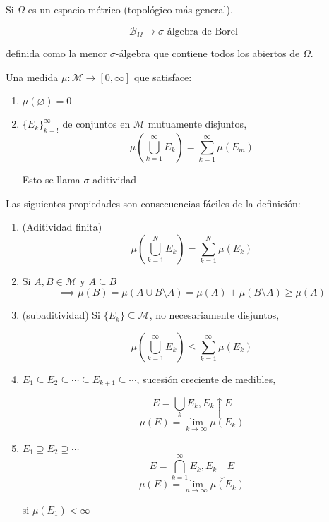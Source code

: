 \begin{fexample}
    Si $\Omega$ es un espacio métrico (topológico más general).

    \[\mathcal{B}_\Omega\to \sigma\text{-álgebra de Borel}\]

    definida como la menor $\sigma$-álgebra que contiene todos los abiertos de $\Omega$.
\end{fexample}

\begin{fdefinition}
    Una medida $\mu:\mathcal{M}\to[0,\infty]$ que satisface:

    \begin{enumerate}
        \item $\mu(\varnothing)=0$
        \item $\{E_k\}_{k=!}^\infty$ de conjuntos en $\mathcal{M}$ mutuamente disjuntos, 
        \[\mu\left(\bigcup_{k=1}^\infty E_k\right)=\sum_{k=1}^\infty \mu(E_m)\]

        Esto se llama $\sigma$-aditividad
    \end{enumerate}
\end{fdefinition}

Las siguientes propiedades son consecuencias fáciles de la definición:

\begin{enumerate}
    \item (Aditividad finita) 
    \[\mu\left(\bigcup_{k=1}^N E_k\right)=\sum_{k=1}^N \mu(E_k)\]

    \item Si $A,B\in\mathcal{M}$ y $A\subseteq B$ 
    \[\implies \mu(B)=\mu(A\cup B\setminus A)=\mu(A)+\mu(B\setminus A)\geq \mu(A)\]

    \item (subaditividad) Si $\{E_k\}\subseteq \mathcal{M}$, no necesariamente disjuntos,
    
    \[\mu\left(\bigcup_{k=1}^\infty E_k\right)\leq \sum_{k=1}^\infty \mu(E_k)\]

    \item $E_1\subseteq E_2\subseteq \cdots\subseteq E_{k+1}\subseteq \cdots$, sucesión creciente de medibles, 
    
    \[E=\bigcup_k E_k, E_k\uparrow E\]
    \[\mu(E)=\lim_{k\to\infty} \mu(E_k)\]

    \item $E_1\supseteq E_2\supseteq \cdots$
    \[E=\bigcap_{k=1}^\infty E_k, E_k\downarrow E\]
    \[\mu(E)=\lim_{n\to\infty} \mu(E_k)\]

    si $\mu(E_1)<\infty$
\end{enumerate}

